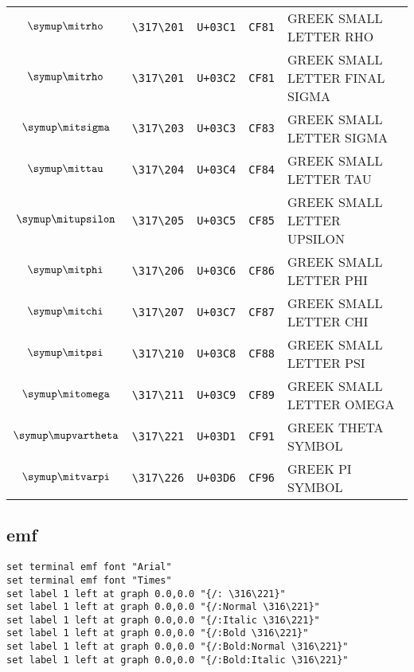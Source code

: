 \documentclass{ltjsarticle}
\begin{document}
\begin{table}[ht]
\begin{tabular}{|ccccl|}
					\( \symup\mitrho \)      & \verb|\317\201| & \verb|U+03C1| & \verb|CF81| & GREEK SMALL LETTER RHO\\%
					\( \symup\mitrho \)      & \verb|\317\201| & \verb|U+03C2| & \verb|CF81| & GREEK SMALL LETTER FINAL SIGMA\\%
					\( \symup\mitsigma \)    & \verb|\317\203| & \verb|U+03C3| & \verb|CF83| & GREEK SMALL LETTER SIGMA\\%
					\( \symup\mittau \)      & \verb|\317\204| & \verb|U+03C4| & \verb|CF84| & GREEK SMALL LETTER TAU\\%
					\( \symup\mitupsilon \)  & \verb|\317\205| & \verb|U+03C5| & \verb|CF85| & GREEK SMALL LETTER UPSILON\\%
					\( \symup\mitphi \)      & \verb|\317\206| & \verb|U+03C6| & \verb|CF86| & GREEK SMALL LETTER PHI\\%
					\( \symup\mitchi \)      & \verb|\317\207| & \verb|U+03C7| & \verb|CF87| & GREEK SMALL LETTER CHI\\%
					\( \symup\mitpsi \)      & \verb|\317\210| & \verb|U+03C8| & \verb|CF88| & GREEK SMALL LETTER PSI\\%
					\( \symup\mitomega \)    & \verb|\317\211| & \verb|U+03C9| & \verb|CF89| & GREEK SMALL LETTER OMEGA\\%
					\( \symup\mupvartheta \) & \verb|\317\221| & \verb|U+03D1| & \verb|CF91| & GREEK THETA SYMBOL\\%
					\( \symup\mitvarpi \)    & \verb|\317\226| & \verb|U+03D6| & \verb|CF96| & GREEK PI SYMBOL\\\hline%
				\end{tabular}
			\end{table}
			\clearpage%

		\subsection{emf}

			\noindent%
			\verb|set terminal emf font "Arial"|\\%
			\verb|set terminal emf font "Times"|\\%
			\verb|set label 1 left at graph 0.0,0.0 "{/: \316\221}"|\\%
			\verb|set label 1 left at graph 0.0,0.0 "{/:Normal \316\221}"|\\%
			\verb|set label 1 left at graph 0.0,0.0 "{/:Italic \316\221}"|\\%
			\verb|set label 1 left at graph 0.0,0.0 "{/:Bold \316\221}"|\\%
			\verb|set label 1 left at graph 0.0,0.0 "{/:Bold:Normal \316\221}"|\\%
			\verb|set label 1 left at graph 0.0,0.0 "{/:Bold:Italic \316\221}"|\\%
\end{document}
